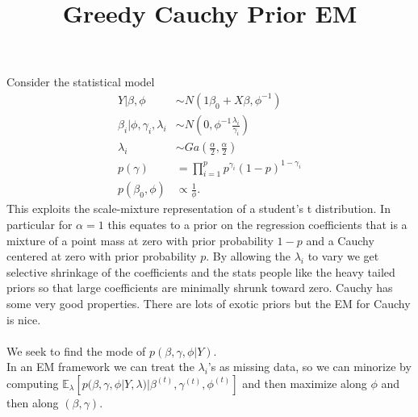 \documentclass[6pt]{article}
\begin{document}

\vspace{-1in}
\title{\bf Greedy Cauchy Prior EM}
\maketitle \centerline{{\color{RoyalBlue2}{Michael Lindon}}}\bigskip
Consider the statistical model
\begin{align*}
	Y|\beta,\phi &\sim N(1\beta_{0}+X\beta,\phi^{-1})\\
	\beta_{i}|\phi, \gamma_{i},\lambda_{i}&\sim N\left( 0,\phi^{-1}\frac{\lambda_{i}}{\gamma_{i}}\right)\\
	\lambda_{i}&\sim Ga\left( \frac{\alpha}{2},\frac{\alpha}{2} \right)\\
	p(\gamma)&=\prod_{i=1}^{p}p^{\gamma_{i}}(1-p)^{1-\gamma_{i}}\\
	p(\beta_{0},\phi)&\propto \frac{1}{\phi}.
\end{align*}
This exploits the scale-mixture representation of a student's t distribution. In particular for $\alpha=1$ this equates to a prior on the regression coefficients that is a mixture of a point mass at zero with prior probability $1-p$ and a Cauchy centered at zero with prior probability $p$. By allowing the $\lambda_{i}$ to vary we get selective shrinkage of the coefficients and the stats people like the heavy tailed priors so that large coefficients are minimally shrunk toward zero. Cauchy has some very good properties. There are lots of exotic priors but the EM for Cauchy is nice.\\
\\
We seek to find the mode of $p(\beta,\gamma,\phi|Y)$. \\
In an EM framework we can treat the $\lambda_{i}$'s as missing data, so we can minorize by computing $\mathbb{E}_{\lambda}[p(\beta,\gamma,\phi|Y,\lambda)|\beta^{(t)},\gamma^{(t)},\phi^{(t)}]$ and then maximize along $\phi$ and then along $(\beta,\gamma)$.
\end{document}
